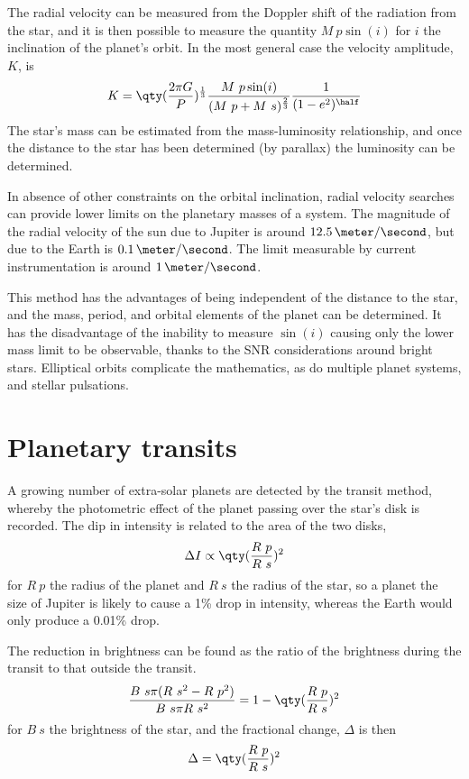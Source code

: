The radial velocity can be measured from the Doppler shift of the
radiation from the star, and it is then possible to measure the
quantity $M~p \sin(i)$ for $i$ the inclination of the planet's
orbit. In the most general case the velocity amplitude, $K$, is
\begin{equation}
  \label{eq:18}
  K = \qty( \frac{2 \pi G}{P})^{\frac{1}{3}} \frac{M~p \sin(i)}{(M~p + M~s)^{\frac{2}{3}}} \frac{1}{(1-e^2)^{\half}}
\end{equation}
The star's mass can be estimated from the mass-luminosity
relationship, and once the distance to the star has been determined
(by parallax) the luminosity can be determined.

In absence of other constraints on the orbital inclination, radial
velocity searches can provide lower limits on the planetary masses of
a system. The magnitude of the radial velocity of the sun due to
Jupiter is around $12.5\,\meter/\second$, but due to the Earth is
$0.1\,\meter/\second$. The limit measurable by current instrumentation
is around $1\,\meter/\second$.

This method has the advantages of being independent of the distance to
the star, and the mass, period, and orbital elements of the planet can
be determined. It has the disadvantage of the inability to measure
$\sin(i)$ causing only the lower mass limit to be observable, thanks
to the SNR considerations around bright stars. Elliptical orbits
complicate the mathematics, as do multiple planet systems, and stellar
pulsations.

\section{Planetary transits}
\label{sec:planetary-transits}

A growing number of extra-solar planets are detected by the transit
method, whereby the photometric effect of the planet passing over the
star's disk is recorded. The dip in intensity is related to the area
of the two disks,
\begin{equation}
  \label{eq:19}
  \Delta I \propto \qty( \frac{R~p}{R~s} )^2
\end{equation}
for $R~p$ the radius of the planet and $R~s$ the radius of the star,
so a planet the size of Jupiter is likely to cause a 1\% drop in
intensity, whereas the Earth would only produce a 0.01\% drop.

The reduction in brightness can be found as the ratio of the
brightness during the transit to that outside the transit.
\begin{equation}
  \label{eq:20}
  \frac{B~s \pi (R~s^2 - R~p^2)}{B~s \pi R~s^2} = 1 - \qty( \frac{R~p}{R~s} )^2
\end{equation}
for $B~s$ the brightness of the star, and the fractional change,
$\Delta$ is then
\begin{equation}
  \label{eq:21}
  \Delta = \qty( \frac{R~p}{R~s} )^2
\end{equation}

